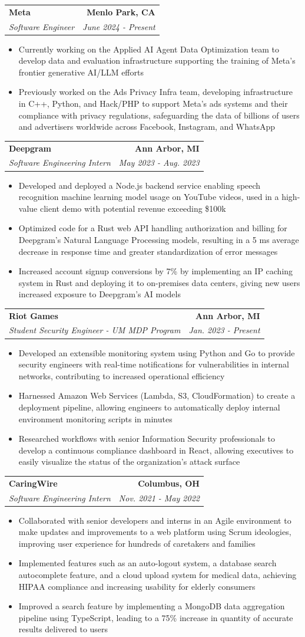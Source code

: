 \documentclass[letterpaper,11pt]{article}
\makeatletter
\newcommand{\resumeItem}[1]{
  \item\small{
    {#1 \vspace{-3pt}}
  }
}
\newcommand{\resumeSubheading}[4]{
  \vspace{-3pt}\item
    \begin{tabular*}{1.0\textwidth}[t]{l@{\extracolsep{\fill}}r}
      \textbf{#1} & \textbf{\small #2} \\
      \textit{\small#3} & \textit{\small #4} \\
    \end{tabular*}\vspace{-7pt}
}
\newcommand{\resumeItemListStart}{\begin{itemize}}
\newcommand{\resumeItemListEnd}{\end{itemize}\vspace{0pt}}
\makeatother
\begin{document}
\resumeSubheading
{Meta}{Menlo Park, CA}
{Software Engineer}{June 2024 - Present}
\resumeItemListStart
\resumeItem{Currently working on the Applied AI Agent Data Optimization team to develop data and evaluation infrastructure supporting the training of Meta's frontier generative AI/LLM efforts}
\resumeItem{Previously worked on the Ads Privacy Infra team, developing infrastructure in C++, Python, and Hack/PHP to support Meta's ads systems and their compliance with privacy regulations, safeguarding the data of billions of users and advertisers worldwide across Facebook, Instagram, and WhatsApp}
\resumeItemListEnd

\resumeSubheading
{Deepgram}{Ann Arbor, MI}
{Software Engineering Intern}{May 2023 - Aug. 2023}
\resumeItemListStart
\resumeItem{Developed and deployed a Node.js backend service enabling speech recognition machine learning model usage on YouTube videos, used in a high-value client demo with potential revenue exceeding \$100k}
\resumeItem{Optimized code for a Rust web API handling authorization and billing for Deepgram’s Natural Language Processing models, resulting in a 5 ms average decrease in response time and greater standardization of error messages}
\resumeItem{Increased account signup conversions by 7\% by implementing an IP caching system in Rust and deploying it to on-premises data centers, giving new users increased exposure to Deepgram’s AI models}
\resumeItemListEnd

\resumeSubheading
{Riot Games}{Ann Arbor, MI}
{Student Security Engineer - UM MDP Program}{Jan. 2023 - Present}
\resumeItemListStart
\resumeItem{Developed an extensible monitoring system using Python and Go to provide security engineers with real-time notifications for vulnerabilities in internal networks, contributing to increased operational efficiency}
\resumeItem{Harnessed Amazon Web Services (Lambda, S3, CloudFormation) to create a deployment pipeline, allowing engineers to automatically deploy internal environment monitoring scripts in minutes}
\resumeItem{Researched workflows with senior Information Security professionals to develop a continuous compliance dashboard in React, allowing executives to easily visualize the status of the organization’s attack surface}
\resumeItemListEnd

\resumeSubheading
{CaringWire}{Columbus, OH}
{Software Engineering Intern}{Nov. 2021 - May 2022}
\resumeItemListStart
\resumeItem{Collaborated with senior developers and interns in an Agile environment to make updates and improvements to a web platform using Scrum ideologies, improving user experience for hundreds of caretakers and families}
\resumeItem{Implemented features such as an auto-logout system, a database search autocomplete feature, and a cloud upload system for medical data, achieving HIPAA compliance and increasing usability for elderly consumers}
\resumeItem{Improved a search feature by implementing a MongoDB data aggregation pipeline using TypeScript, leading to a 75\% increase in quantity of accurate results delivered to users}
\resumeItemListEnd
\end{document}
